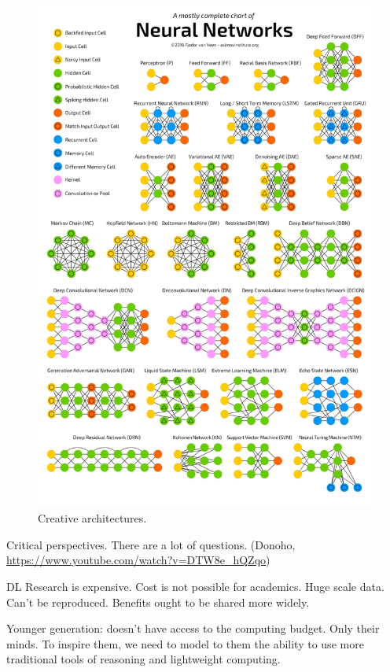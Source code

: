 \documentclass[english]{article}
\begin{document}
\begin{figure}
  \centering
  \includegraphics[scale=0.35]{Chart.png}
  \caption{Creative architectures.}
  \label{arch}
\end{figure}

\item Critical perspectives. There are a lot of questions. (Donoho, \url{https://www.youtube.com/watch?v=DTW8e_hQZqo})

DL Research is expensive. Cost is not possible for academics. Huge scale data. Can't be reproduced. Benefits ought to be shared more widely. 

Younger generation: doesn't have access to the computing budget. Only their minds. To inspire them, we need to model to them the ability to use more traditional tools of reasoning and lightweight computing.
\end{document}
